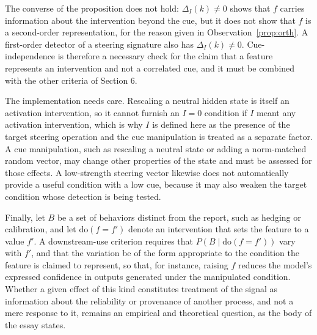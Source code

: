 \documentclass[11pt]{article}
\theoremstyle{definition}
\theoremstyle{remark}
\begin{document}
The converse of the proposition does not hold: $\Delta_I(k)\neq0$ shows that $f$ carries information about the intervention beyond the cue, but it does not show that $f$ is a second-order representation, for the reason given in Observation~\ref{prop:orth}. A first-order detector of a steering signature also has $\Delta_I(k)\neq 0$. Cue-independence is therefore a necessary check for the claim that a feature represents an intervention and not a correlated cue, and it must be combined with the other criteria of Section 6.

The implementation needs care. Rescaling a neutral hidden state is itself an activation intervention, so it cannot furnish an $I=0$ condition if $I$ meant any activation intervention, which is why $I$ is defined here as the presence of the target steering operation and the cue manipulation is treated as a separate factor. A cue manipulation, such as rescaling a neutral state or adding a norm-matched random vector, may change other properties of the state and must be assessed for those effects. A low-strength steering vector likewise does not automatically provide a useful condition with a low cue, because it may also weaken the target condition whose detection is being tested.

Finally, let $B$ be a set of behaviors distinct from the report, such as hedging or calibration, and let $\mathrm{do}(f=f')$ denote an intervention that sets the feature to a value $f'$. A downstream-use criterion requires that $P(B\mid\mathrm{do}(f=f'))$ vary with $f'$, and that the variation be of the form appropriate to the condition the feature is claimed to represent, so that, for instance, raising $f$ reduces the model's expressed confidence in outputs generated under the manipulated condition. Whether a given effect of this kind constitutes treatment of the signal as information about the reliability or provenance of another process, and not a mere response to it, remains an empirical and theoretical question, as the body of the essay states.
\end{document}
